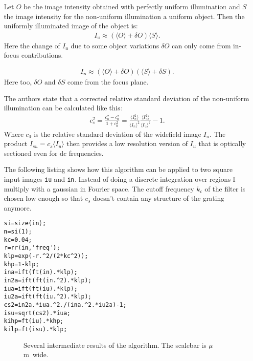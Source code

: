 \documentclass[11pt,abstracton,titlepage]{scrartcl}
\newcommand{\avg}[1]{\langle #1 \rangle}
\begin{document}
Let $O$ be the image intensity obtained with perfectly uniform
illumination and $S$ the image intensity for the non-uniform
illumination a uniform object. Then the uniformly illuminated image of
the object is:
\begin{align}
  I_u\approx (\avg{O}+\delta O)\avg{S}.
\end{align}
Here the change of $I_u$ due to some object variations $\delta O$ can
only come from in-focus contributions.

\begin{align}
\label{in}
  I_n\approx (\avg{O}+\delta O)(\avg{S}+\delta S).
\end{align}
Here too, $\delta O$ and $\delta S$ come from the focus plane.

The authors state that a corrected relative standard deviation
of the non-uniform illumination can be calculated like this:
\begin{align} 
  c_s^2=\frac{c_n^2-c_0^2}{1+c_0^2}
  =
  \frac{\avg{I_n^2}}{\avg{I_n}^2}
  \frac{\avg{I_u^2}}{\avg{I_u}^2}-1.
\end{align}
Where $c_0$ is the relative standard deviation of the widefield image
$I_u$. The product $I_{su}=c_s\avg{I_u}$ then provides a low
resolution version of $I_u$ that is optically sectioned even for dc
frequencies.

The following listing shows how this algorithm can be applied to two
square input images {\tt iu} and {\tt in}. Instead of doing a discrete
integration over regions I multiply with a gaussian in Fourier
space. The cutoff frequency $k_c$ of the filter is chosen low enough
so that $c_s$ doesn't contain any structure of the grating anymore.
\begin{lstlisting}
si=size(in);
n=si(1);
kc=0.04;
r=rr(in,'freq');
klp=exp(-r.^2/(2*kc^2));
khp=1-klp;
ina=ift(ft(in).*klp);
in2a=ift(ft(in.^2).*klp);
iua=ift(ft(iu).*klp);
iu2a=ift(ft(iu.^2).*klp);
cs2=in2a.*iua.^2./(ina.^2.*iu2a)-1;
isu=sqrt(cs2).*iua;
kihp=ft(iu).*khp;
kilp=ft(isu).*klp;
\end{lstlisting}

\begin{figure}[htb]
  \centering
  \caption{Several intermediate results of the algorithm. The scalebar is
    \unit[2]{$\mu$m} wide.}
  \label{fig:hilo1interm}
\end{figure}
\end{document}
